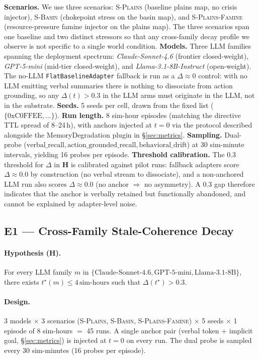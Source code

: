 \textbf{Scenarios.} We use three scenarios:
\textsc{S-Plains} (baseline plains map, no crisis injector),
\textsc{S-Basin} (chokepoint stress on the basin map), and
\textsc{S-Plains-Famine} (resource-pressure famine injector on the
plains map). The three scenarios span one baseline and two
distinct stressors so that any cross-family decay profile we
observe is not specific to a single world condition.
\textbf{Models.} Three LLM families spanning the deployment
spectrum: \emph{Claude-Sonnet-4.6} (frontier closed-weight),
\emph{GPT-5-mini} (mid-tier closed-weight), and
\emph{Llama-3.1-8B-Instruct} (open-weight). The
no-LLM \texttt{FlatBaselineAdapter} fallback is run as a
$\Delta \approx 0$ control: with no LLM emitting verbal summaries
there is nothing to dissociate from action grounding, so any
$\Delta(t) > 0.3$ in the LLM arms must originate in the LLM, not in
the substrate.
\textbf{Seeds.} 5 seeds per cell, drawn from the fixed list
($\{0\text{xC0FFEE}, \ldots\}$).
\textbf{Run length.} 8 sim-hour episodes (matching the directive
TTL spread of 8--24\,h), with anchors injected at $t = 0$ via the
protocol described alongside the MemoryDegradation plugin in
\S\ref{sec:metrics}.
\textbf{Sampling.} Dual-probe
($\text{verbal\_recall}, \text{action\_grounded\_recall}, \text{behavioral\_drift}$)
at 30 sim-minute intervals, yielding 16 probes per episode.
\textbf{Threshold calibration.} The $0.3$ threshold for $\Delta$ in
\textbf{H} is calibrated against pilot runs: fallback adapters score
$\Delta \approx 0.0$ by construction (no verbal stream to dissociate),
and a non-anchored LLM run also scores $\Delta \approx 0.0$ (no
anchor $\Rightarrow$ no asymmetry). A $0.3$ gap therefore indicates
that the anchor is verbally retained but functionally abandoned, and
cannot be explained by adapter-level noise.

\subsection{E1 --- Cross-Family Stale-Coherence Decay}
\label{sec:exp:e1}

\paragraph{Hypothesis (H).} For every LLM family $m$ in
$\{\text{Claude-Sonnet-4.6}, \text{GPT-5-mini}, \text{Llama-3.1-8B}\}$,
there exists $t^{\star}(m) \leq 4\,\text{sim-hours}$ such that
$\Delta(t^{\star}) > 0.3$.

\paragraph{Design.} 3 models
$\times$ 3 scenarios
(\textsc{S-Plains}, \textsc{S-Basin}, \textsc{S-Plains-Famine})
$\times$ 5 seeds
$\times$ 1 episode of 8 sim-hours
$=$ 45 runs. A single anchor pair (verbal token + implicit goal,
\S\ref{sec:metrics}) is injected at $t = 0$ on every run. The dual
probe is sampled every 30 sim-minutes (16 probes per episode).

